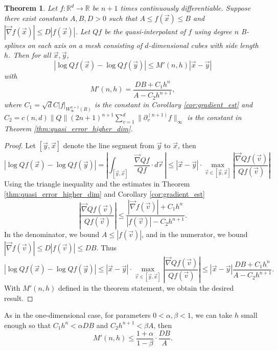 \documentclass[10pt]{article}
\newtheorem{theorem}{Theorem}[section]
\theoremstyle{definition}
\numberwithin{equation}{section}
\numberwithin{figure}{section}
\numberwithin{table}{section}
\begin{document}
\begin{theorem}
Let $f:\mathbb{R}^d\to \mathbb{R}$ be $n+1$ times continuously differentiable. Suppose there exist constants $A,B,D>0$ such that $A\leq f(\vec{x})\leq B$ and $|\vec\nabla f(\vec{x})|\leq D|f(\vec{x})|$. Let $ Qf$ be the quasi-interpolant of $f$ using degree $n$ B-splines on each axis on a mesh consisting of $d$-dimensional cubes with side length $h$. Then for all $\vec{x},\vec{y}$,
$$|\log Qf(\vec x)-\log Qf(\vec y)|\leq M'(n,h)|\vec{x}-\vec{y}|$$
with
$$M'(n,h)=\frac{DB+C_1h^n}{A-C_2h^{n+1}},$$ 
where $C_1=\sqrt{d}C|f|_{W^{n+1}_\infty(R)}$ is the constant in Corollary \ref{cor:gradient_est} and $C_2=c(n,d)\|Q\|(2n+1)^{n+1}\sum_{v=1}^d\|\partial^{(n+1)}_vf\|_\infty$ is the constant in Theorem \ref{thm:quasi_error_higher_dim}.
\label{thm:2d_cone_map}
\end{theorem}
\begin{proof}
Let $[\vec y,\vec x]$ denote the line segment from $\vec{y}$ to $\vec x$, then
$$|\log Qf(\vec x)-\log Qf(\vec y)|=\left|\int_{[\vec y,\vec x]}\frac{\vec\nabla Qf}{ Qf}\cdot d\vec{r}\,\right|\leq |\vec{x}-\vec{y}|\cdot\max_{\vec{v}\in[\vec y,\vec x]}\left|\frac{\vec\nabla  Qf(\vec v)}{ Qf(\vec v)}\right|$$
Using the triangle inequality and the estimates in Theorem \ref{thm:quasi_error_higher_dim} and Corollary \ref{cor:gradient_est}
$$\left|\frac{\vec\nabla  Qf(\vec v)}{ Qf(\vec v)}\right|\leq\frac{|\vec{\nabla}f(\vec v)|+C_1h^n}{|f(\vec v)|-C_2h^{n+1}}.$$
In the denominator, we bound $A\leq |f(\vec{v})|$, and in the numerator, we bound $|\vec\nabla f(\vec{v})|\leq D|f(\vec{v})|\leq DB$. Thus
$$|\log Qf(\vec x)-\log Qf(\vec y)|\leq |\vec{x}-\vec{y}|\cdot\max_{\vec{v}\in[\vec y,\vec x]}\left|\frac{\vec\nabla  Qf(\vec v)}{ Qf(\vec v)}\right|\leq|\vec x-\vec y|\frac{DB+C_1h^n}{A-C_2h^{n+1}}.$$
With $M'(n,h)$ defined in the theorem statement, we obtain the desired result.
\end{proof}

As in the one-dimensional case, for parameters $0<\alpha,\beta<1$, we can take $h$ small enough so that $C_1h^n<\alpha DB$ and $C_2h^{n+1}<\beta A$, then
$$M'(n,h)\leq\frac{1+\alpha}{1-\beta}\cdot \frac{DB}{A}.$$
\end{document}
